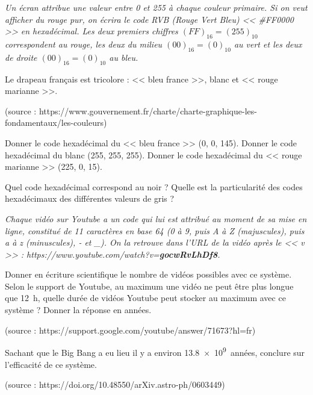 \documentclass["../Cours.tex"]{subfiles}
\begin{document}
\begin{questions}
    \textit{Un écran attribue une valeur entre 0 et 255 à chaque couleur primaire. Si on veut afficher du rouge pur, on écrira le code RVB (Rouge Vert Bleu) << \#FF0000 >> en hexadécimal. Les deux premiers chiffres $(FF)_{16} = (255)_{10}$ correspondent au rouge, les deux du milieu $(00)_{16}=(0)_{10}$ au vert et les deux de droite $(00)_{16}=(0)_{10}$ au bleu. }

    \question Le drapeau français est tricolore : << bleu france >>, blanc et << rouge marianne >>. 
    \begin{flushright}\vspace{-1ex}
        (source : \scriptsize{https://www.gouvernement.fr/charte/charte-graphique-les-fondamentaux/les-couleurs})
    \end{flushright}\vspace{-1ex}
    \subquestion Donner le code hexadécimal du << bleu france >> (0, 0, 145).
    \subquestion Donner le code hexadécimal du blanc (255, 255, 255).
    \subquestion Donner le code hexadécimal du << rouge marianne >> (225, 0, 15).

    \question Quel code hexadécimal correspond au noir ?
    \question Quelle est la particularité des codes hexadécimaux des différentes valeurs de gris ?

    \textit{Chaque vidéo sur Youtube a un code qui lui est attribué au moment de sa mise en ligne, constitué de 11 caractères en base 64 (0 à 9, puis A à Z (majuscules), puis a à z (minuscules), - et \_). On la retrouve dans l'URL de la vidéo après le << v >> : https://www.youtube.com/watch?v=\textbf{gocwRvLhDf8}.}

    \question Donner en écriture scientifique le nombre de vidéos possibles avec ce système.
    \question Selon le support de Youtube, au maximum une vidéo ne peut être plus longue que \qty{12}{\hour}, quelle durée de vidéos Youtube peut stocker au maximum avec ce système ? Donner la réponse en années.
    \begin{flushright}\vspace{-1ex}
        (source : \scriptsize{https://support.google.com/youtube/answer/71673?hl=fr})
    \end{flushright}\vspace{-1ex}
    \question Sachant que le Big Bang a eu lieu il y a environ \qty{13.8e9}{années}, conclure sur l'efficacité de ce système.
        \begin{flushright}\vspace{-1ex}
        (source : \scriptsize{https://doi.org/10.48550/arXiv.astro-ph/0603449})
    \end{flushright}\vspace{-1ex}

\end{questions}
\end{document}
